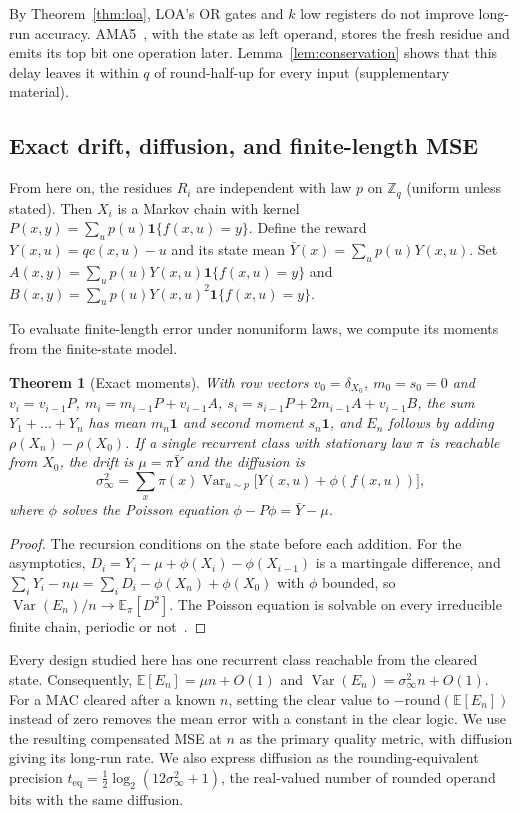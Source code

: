 \documentclass[preprint,12pt,numbers]{elsarticle}
\newcommand{\E}{\mathbb{E}}
\newcommand{\Var}{\operatorname{Var}}
\newcommand{\Z}{\mathbb{Z}}
\newtheorem{theorem}{Theorem}
\theoremstyle{definition}
\begin{document}
By Theorem~\ref{thm:loa}, LOA's OR gates and $k$ low registers do not
improve long-run accuracy.
AMA5~\cite{gupta2013ama}, with the state as left operand,
stores the fresh residue and emits its top bit one operation later.
Lemma~\ref{lem:conservation} shows that this delay leaves it within $q$
of round-half-up for every input (supplementary material).

\subsection{Exact drift, diffusion, and finite-length MSE}

From here on, the residues $R_i$ are independent with law $p$ on
$\Z_q$ (uniform unless stated). Then $X_i$ is a Markov chain with kernel
$P(x,y)=\sum_u p(u)\mathbf 1\{f(x,u)=y\}$. Define the reward
$Y(x,u)=qc(x,u)-u$ and its state mean
$\bar Y(x)=\sum_up(u)Y(x,u)$. Set
$A(x,y)=\sum_up(u)Y(x,u)\mathbf1\{f(x,u)=y\}$ and
$B(x,y)=\sum_up(u)Y(x,u)^2\mathbf1\{f(x,u)=y\}$.

To evaluate finite-length error under nonuniform laws, we compute its
moments from the finite-state model.
\begin{theorem}[Exact moments]\label{thm:moments}
With row vectors $v_0=\delta_{X_0}$, $m_0=s_0=0$ and
$v_i=v_{i-1}P$, $m_i=m_{i-1}P+v_{i-1}A$, $s_i=s_{i-1}P+2m_{i-1}A+v_{i-1}B$,
the sum $Y_1+\dots+Y_n$ has mean $m_n\mathbf1$ and second moment $s_n\mathbf1$,
and $E_n$ follows by adding $\rho(X_n)-\rho(X_0)$. If a single recurrent class
with stationary law $\pi$ is reachable from $X_0$, the drift is $\mu=\pi\bar Y$
and the diffusion is
\begin{equation}
\sigma^2_\infty=\sum_x\pi(x)\Var_{u\sim p}\bigl[Y(x,u)+\phi(f(x,u))\bigr],
\label{eq:diffusion}
\end{equation}
where $\phi$ solves the Poisson equation $\phi-P\phi=\bar Y-\mu$.
\end{theorem}
\begin{proof}
The recursion conditions on the state before each addition. For the
asymptotics, $D_i=Y_i-\mu+\phi(X_i)-\phi(X_{i-1})$ is a martingale difference,
and $\sum_iY_i-n\mu=\sum_iD_i-\phi(X_n)+\phi(X_0)$ with $\phi$ bounded, so
$\Var(E_n)/n\to\E_\pi[D^2]$. The Poisson equation is solvable on every
irreducible finite chain, periodic or not~\cite{kemeny1960,glynn1996poisson}.
\end{proof}

Every design studied here has one recurrent class reachable from the
cleared state. Consequently, $\E[E_n]=\mu n+O(1)$ and
$\Var(E_n)=\sigma^2_\infty n+O(1)$.
For a MAC cleared after a known $n$, setting the clear value to
$-\mathrm{round}(\E[E_n])$ instead of zero removes the mean error with a
constant in the clear logic. We use the resulting compensated MSE at $n$
as the primary quality metric, with diffusion giving its long-run rate.
We also express diffusion as the rounding-equivalent precision
$t_{\mathrm{eq}}=\tfrac12\log_2(12\sigma^2_\infty+1)$, the real-valued number
of rounded operand bits with the same diffusion.
\end{document}
